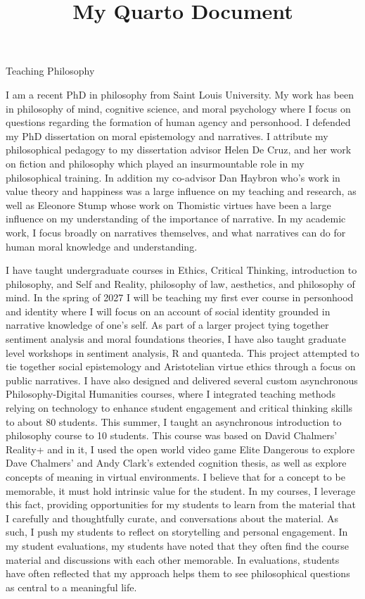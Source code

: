 \documentclass[
  letterpaper,
  DIV=11,
  numbers=noendperiod]{scrartcl}
\title{My Quarto Document}
\author{}
\date{}
\begin{document}
\maketitle


Teaching Philosophy

I am a recent PhD in philosophy from Saint Louis University. My work has
been in philosophy of mind, cognitive science, and moral psychology
where I focus on questions regarding the formation of human agency and
personhood. I defended my PhD dissertation on moral epistemology and
narratives. I attribute my philosophical pedagogy to my dissertation
advisor Helen De Cruz, and her work on fiction and philosophy which
played an insurmountable role in my philosophical training. In addition
my co-advisor Dan Haybron who's work in value theory and happiness was a
large influence on my teaching and research, as well as Eleonore Stump
whose work on Thomistic virtues have been a large influence on my
understanding of the importance of narrative. In my academic work, I
focus broadly on narratives themselves, and what narratives can do for
human moral knowledge and understanding.

I have taught undergraduate courses in Ethics, Critical Thinking,
introduction to philosophy, and Self and Reality, philosophy of law,
aesthetics, and philosophy of mind. In the spring of 2027 I will be
teaching my first ever course in personhood and identity where I will
focus on an account of social identity grounded in narrative knowledge
of one's self. As part of a larger project tying together sentiment
analysis and moral foundations theories, I have also taught graduate
level workshops in sentiment analysis, R and quanteda. This project
attempted to tie together social epistemology and Aristotelian virtue
ethics through a focus on public narratives. I have also designed and
delivered several custom asynchronous Philosophy-Digital Humanities
courses, where I integrated teaching methods relying on technology to
enhance student engagement and critical thinking skills to about 80
students. This summer, I taught an asynchronous introduction to
philosophy course to 10 students. This course was based on David
Chalmers' Reality+ and in it, I used the open world video game Elite
Dangerous to explore Dave Chalmers' and Andy Clark's extended cognition
thesis, as well as explore concepts of meaning in virtual environments.
I believe that for a concept to be memorable, it must hold intrinsic
value for the student. In my courses, I leverage this fact, providing
opportunities for my students to learn from the material that I
carefully and thoughtfully curate, and conversations about the material.
As such, I push my students to reflect on storytelling and personal
engagement. In my student evaluations, my students have noted that they
often find the course material and discussions with each other
memorable. In evaluations, students have often reflected that my
approach helps them to see philosophical questions as central to a
meaningful life.
\end{document}
